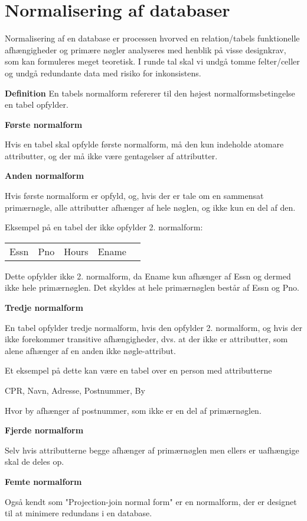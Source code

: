 \section{Normalisering af databaser}


Normalisering af en database er processen hvorved en relation/tabels funktionelle afhængigheder og primære nøgler
analyseres med henblik på visse designkrav, som kan formuleres meget teoretisk. I runde tal skal vi undgå
tomme felter/celler og undgå redundante data med risiko for inkonsistens.


\textbf{Definition}
En tabels normalform refererer til den højest normalformsbetingelse en tabel opfylder.

\textbf{Første normalform}

Hvis en tabel skal opfylde første normalform, må den kun indeholde atomare attributter, og der må ikke være
gentagelser af attributter.

\textbf{Anden normalform}

Hvis første normalform er opfyld, og, hvis der er tale om en sammensat primærnøgle, alle attributter
afhænger af hele nøglen, og ikke kun en del af den.

Eksempel på en tabel der ikke opfylder 2. normalform:

\begin{tabular}{|c|c|c|c|c|}
	Essn & Pno & Hours & Ename
\end{tabular}

Dette opfylder ikke 2. normalform, da Ename kun afhænger af Essn og
dermed ikke hele primærnøglen.
Det skyldes at hele primærnøglen består af Essn og Pno.

\textbf{Tredje normalform}

En tabel opfylder tredje normalform, hvis den opfylder 2. normalform,
og hvis der ikke forekommer transitive afhængigheder, dvs. at der ikke
er attributter, som alene afhænger af en anden ikke nøgle-attribut.

Et eksempel på dette kan være en tabel over en person med attributterne

\begin{center}
	CPR, Navn, Adresse, Postnummer, By
\end{center}

Hvor by afhænger af postnummer, som ikke er en del af primærnøglen.



\textbf{Fjerde normalform}

Selv hvis attributterne begge afhænger af primærnøglen men ellers er
uafhængige skal de deles op.


\textbf{Femte normalform}

Også kendt som "Projection-join normal form" er en normalform, der er
designet til at minimere redundans i en database.
